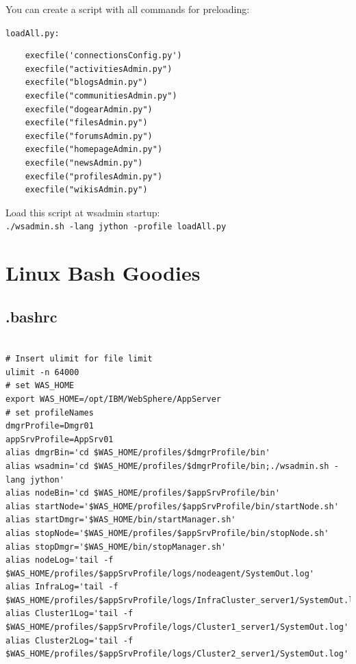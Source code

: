\documentclass[12pt,a4paper]{article}
\begin{document}
You can create a script with all commands for preloading:

\texttt{loadAll.py:}

\begin{lstlisting}
	execfile('connectionsConfig.py')
	execfile("activitiesAdmin.py")
	execfile("blogsAdmin.py")
	execfile("communitiesAdmin.py")
	execfile("dogearAdmin.py")
	execfile("filesAdmin.py")
	execfile("forumsAdmin.py")
	execfile("homepageAdmin.py")
	execfile("newsAdmin.py")
	execfile("profilesAdmin.py")
	execfile("wikisAdmin.py")
\end{lstlisting}

Load this script at wsadmin startup:\\
\lstinline{./wsadmin.sh -lang jython -profile loadAll.py}

\appendix 

\section{Linux Bash Goodies}
\begin{landscape}
\subsection{.bashrc}

\begin{lstlisting}

# Insert ulimit for file limit 
ulimit -n 64000 
# set WAS_HOME
export WAS_HOME=/opt/IBM/WebSphere/AppServer
# set profileNames
dmgrProfile=Dmgr01
appSrvProfile=AppSrv01
alias dmgrBin='cd $WAS_HOME/profiles/$dmgrProfile/bin' 
alias wsadmin='cd $WAS_HOME/profiles/$dmgrProfile/bin;./wsadmin.sh -lang jython' 
alias nodeBin='cd $WAS_HOME/profiles/$appSrvProfile/bin'  
alias startNode='$WAS_HOME/profiles/$appSrvProfile/bin/startNode.sh'  
alias startDmgr='$WAS_HOME/bin/startManager.sh' 
alias stopNode='$WAS_HOME/profiles/$appSrvProfile/bin/stopNode.sh'  
alias stopDmgr='$WAS_HOME/bin/stopManager.sh' 
alias nodeLog='tail -f $WAS_HOME/profiles/$appSrvProfile/logs/nodeagent/SystemOut.log' 
alias InfraLog='tail -f $WAS_HOME/profiles/$appSrvProfile/logs/InfraCluster_server1/SystemOut.log' 
alias Cluster1Log='tail -f $WAS_HOME/profiles/$appSrvProfile/logs/Cluster1_server1/SystemOut.log' 
alias Cluster2Log='tail -f $WAS_HOME/profiles/$appSrvProfile/logs/Cluster2_server1/SystemOut.log' 

\end{lstlisting}

\end{landscape}
\end{document}
